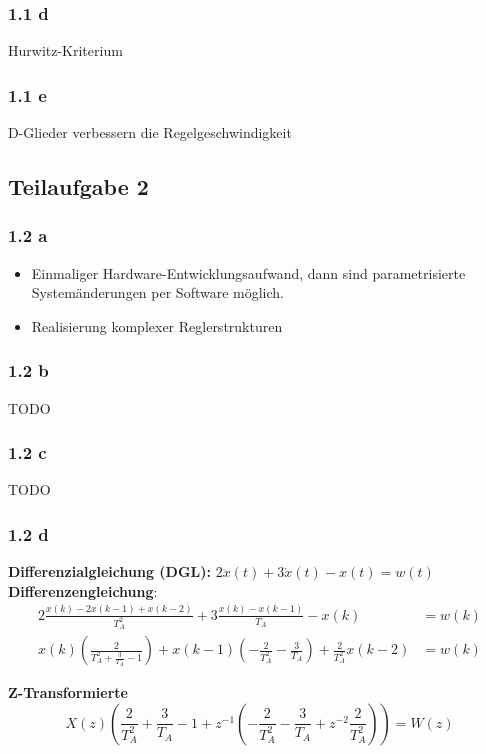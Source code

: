 \documentclass[a4paper]{scrartcl}
\begin{document}
  \subsubsection*{1.1 d}
  Hurwitz-Kriterium

  \subsubsection*{1.1 e}
  D-Glieder verbessern die Regelgeschwindigkeit

  \subsection*{Teilaufgabe 2}
  \subsubsection*{1.2 a}
  \begin{itemize}
      \item Einmaliger Hardware-Entwicklungsaufwand, dann sind parametrisierte
            Systemänderungen per Software möglich.
      \item Realisierung komplexer Reglerstrukturen
  \end{itemize}

  \subsubsection*{1.2 b}
  TODO

  \subsubsection*{1.2 c}
  TODO

  \subsubsection*{1.2 d}
  \textbf{Differenzialgleichung (DGL):} $2 \ddot{x}(t) + 3 \dot{x}(t) - x(t) = w(t)$\\
  \textbf{Differenzengleichung}:
  \begin{align}
      2 \frac{x(k) - 2x(k-1) + x(k-2)}{T_A^2} + 3 \frac{x(k) - x(k-1)}{T_A} - x(k) &= w(k)\\
      x(k) (\frac{2}{T_A^2 + \frac{3}{T_A} - 1}) + x(k-1)(-\frac{2}{T_A^2} - \frac{3}{T_A}) + \frac{2}{T_A^2} x(k-2) &= w(k)
  \end{align}

  \textbf{Z-Transformierte}
  \[X(z) (\frac{2}{T_A^2} + \frac{3}{T_A} - 1 + z^{-1} (- \frac{2}{T_A^2} - \frac{3}{T_A} + z^{-2} \frac{2}{T_A^2})) = W(z)\]
\end{document}
